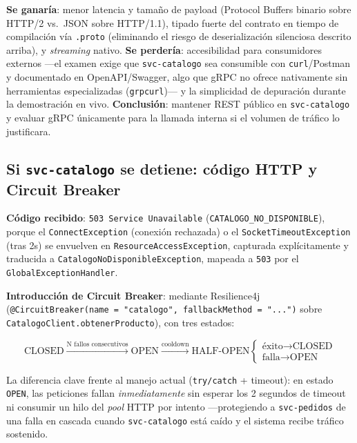\documentclass[11pt,a4paper]{article}
\begin{document}
\textbf{Se ganaría}: menor latencia y tamaño de payload (Protocol Buffers
binario sobre HTTP/2 vs.\ JSON sobre HTTP/1.1), tipado fuerte del contrato en
tiempo de compilación vía \texttt{.proto} (eliminando el riesgo de
deserialización silenciosa descrito arriba), y \emph{streaming} nativo.
\textbf{Se perdería}: accesibilidad para consumidores externos —el examen
exige que \texttt{svc-catalogo} sea consumible con \texttt{curl}/Postman y
documentado en OpenAPI/Swagger, algo que gRPC no ofrece nativamente sin
herramientas especializadas (\texttt{grpcurl})— y la simplicidad de depuración
durante la demostración en vivo. \textbf{Conclusión}: mantener REST público
en \texttt{svc-catalogo} y evaluar gRPC únicamente para la llamada interna si
el volumen de tráfico lo justificara.

\subsection{Si \texttt{svc-catalogo} se detiene: código HTTP y Circuit Breaker}

\textbf{Código recibido}: \texttt{503 Service Unavailable}
(\texttt{CATALOGO\_NO\_DISPONIBLE}), porque el \texttt{ConnectException}
(conexión rechazada) o el \texttt{SocketTimeoutException} (tras 2s) se
envuelven en \texttt{ResourceAccessException}, capturada explícitamente y
traducida a \texttt{CatalogoNoDisponibleException}, mapeada a \texttt{503} por
el \texttt{GlobalExceptionHandler}.

\textbf{Introducción de Circuit Breaker}: mediante Resilience4j
(\texttt{@CircuitBreaker(name = "catalogo", fallbackMethod = "...")}
sobre \texttt{CatalogoClient.obtenerProducto}), con tres estados:

\[
\text{CLOSED} \xrightarrow{\text{N fallos consecutivos}} \text{OPEN}
\xrightarrow{\text{cooldown}} \text{HALF-OPEN}
\begin{cases}
\text{éxito} \to \text{CLOSED} \\
\text{falla} \to \text{OPEN}
\end{cases}
\]

La diferencia clave frente al manejo actual (\texttt{try/catch} + timeout):
en estado \texttt{OPEN}, las peticiones fallan \emph{inmediatamente} sin
esperar los 2 segundos de timeout ni consumir un hilo del \emph{pool} HTTP por
intento —protegiendo a \texttt{svc-pedidos} de una falla en cascada cuando
\texttt{svc-catalogo} está caído y el sistema recibe tráfico sostenido.

\end{document}
